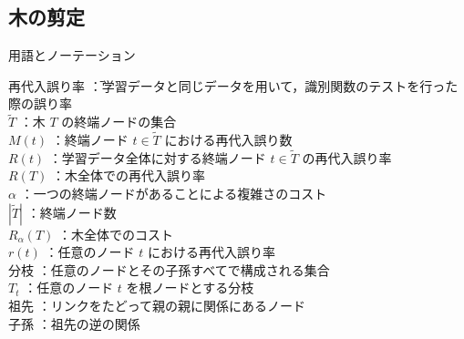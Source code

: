 \documentclass[dvipdfmx]{jreport}
\begin{document}
\subsection{木の剪定}
\label{木の剪定}
\begin{itembox}[l]{\large{用語とノーテーション}}
    \begin{tabbing}
        \hspace{15pt} \raisebox{0.5ex}{\tiny $\bullet$} 再代入誤り率 \=：学習データと同じデータを用いて，識別関数のテストを行った際の誤り率\\[0.5em]
        \hspace{15pt} \raisebox{0.5ex}{\tiny $\bullet$} $\tilde{T}$ \>：木 $T$ の終端ノードの集合\\[0.5em]
        \hspace{15pt} \raisebox{0.5ex}{\tiny $\bullet$} $M(t)$ \>：終端ノード $t \in \tilde{T}$ における再代入誤り数\\[0.5em]
        \hspace{15pt} \raisebox{0.5ex}{\tiny $\bullet$} $R(t)$ \>：学習データ全体に対する終端ノード $t \in \tilde{T}$ の再代入誤り率\\[0.5em]
        \hspace{15pt} \raisebox{0.5ex}{\tiny $\bullet$} $R(T)$ \>：木全体での再代入誤り率\\[0.5em]
        \hspace{15pt} \raisebox{0.5ex}{\tiny $\bullet$} $\alpha$ \>：一つの終端ノードがあることによる複雑さのコスト\\[0.5em]
        \hspace{15pt} \raisebox{0.5ex}{\tiny $\bullet$} $|\tilde{T}|$ \>：終端ノード数\\[0.5em]
        \hspace{15pt} \raisebox{0.5ex}{\tiny $\bullet$} $R_\alpha(T)$ \>：木全体でのコスト\\[0.5em]
        \hspace{15pt} \raisebox{0.5ex}{\tiny $\bullet$} $r(t)$ \>：任意のノード $t$ における再代入誤り率\\[0.5em]
        \hspace{15pt} \raisebox{0.5ex}{\tiny $\bullet$} 分枝 \>：任意のノードとその子孫すべてで構成される集合\\[0.5em]
        \hspace{15pt} \raisebox{0.5ex}{\tiny $\bullet$} $T_t$ \>：任意のノード $t$ を根ノードとする分枝\\[0.5em]
        \hspace{15pt} \raisebox{0.5ex}{\tiny $\bullet$} 祖先 \>：リンクをたどって親の親に関係にあるノード\\[0.5em]
        \hspace{15pt} \raisebox{0.5ex}{\tiny $\bullet$} 子孫 \>：祖先の逆の関係
    \end{tabbing}
\end{itembox}
\end{document}
